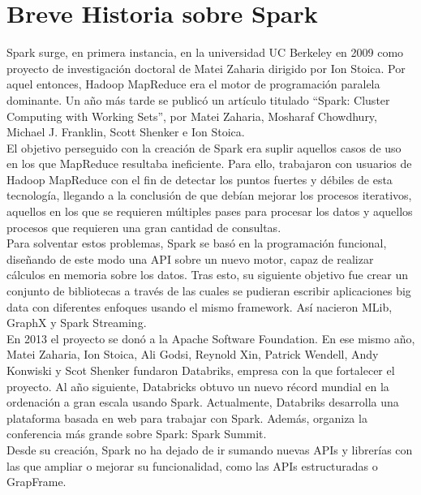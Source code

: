 \chapter{Breve Historia sobre Spark}

Spark surge, en primera instancia,  en la universidad UC Berkeley en 2009 como proyecto de investigación doctoral de Matei Zaharia dirigido por Ion Stoica. Por aquel entonces, Hadoop MapReduce era el motor de programación paralela dominante. Un año más tarde se publicó un artículo titulado “Spark: Cluster Computing with Working Sets”, por Matei Zaharia, Mosharaf Chowdhury, Michael J. Franklin, Scott Shenker e Ion Stoica. \cite{learnSpark}\\

El objetivo perseguido con la creación de Spark era suplir aquellos casos de uso en los que MapReduce resultaba ineficiente. Para ello, trabajaron con usuarios de Hadoop MapReduce con el fin de detectar los puntos fuertes y débiles de esta tecnología, llegando a la conclusión de que debían mejorar los procesos iterativos, aquellos en los que se requieren múltiples pases para procesar los datos y aquellos procesos que requieren una gran cantidad de consultas.\\

Para solventar estos problemas, Spark se basó en la programación funcional, diseñando de este modo una API sobre un nuevo motor, capaz de realizar cálculos en memoria sobre los datos.
Tras esto, su siguiente objetivo fue crear un conjunto de bibliotecas a través de las cuales se pudieran escribir aplicaciones big data con diferentes enfoques usando el mismo framework. Así nacieron MLib, GraphX y Spark Streaming.\\

En 2013 el proyecto se donó a la Apache Software Foundation. En ese mismo año, Matei Zaharia, Ion Stoica, Ali Godsi, Reynold Xin, Patrick Wendell, Andy Konwiski y Scot Shenker fundaron Databriks, empresa con la que fortalecer el proyecto. Al año siguiente, Databricks obtuvo un nuevo récord mundial en la ordenación a gran escala usando Spark. Actualmente, Databriks desarrolla una plataforma basada en web para trabajar con Spark. Además, organiza la conferencia más grande sobre Spark: Spark Summit.\\

Desde su creación, Spark no ha dejado de ir sumando nuevas APIs y librerías con las que ampliar o mejorar su funcionalidad, como las APIs estructuradas o GrapFrame.
